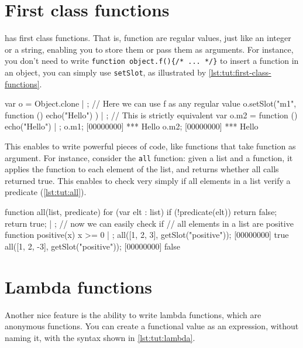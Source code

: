 \section{First class functions}

\us has first class functions. That is, function are regular values,
just like an integer or a string, enabling you to store them or pass
them as arguments. For instance, you don't need to write
\lstinline|function object.f(){/* ... */}| to insert a function in an
object, you can simply use \lstinline{setSlot}, as illustrated by
\autoref{lst:tut:first-class-functions}.

\begin{urbiscript}[caption=First class functions,
  label=lst:tut:first-class-functions]
var o = Object.clone | {};
// Here we can use f as any regular value
o.setSlot("m1", function () { echo("Hello") }) | {};
// This is strictly equivalent
var o.m2 = function () { echo("Hello") } | {};
o.m1;
[00000000] *** Hello
o.m2;
[00000000] *** Hello
\end{urbiscript}

This enables to write powerful pieces of code, like functions that
take function as argument. For instance, consider the \lstinline{all}
function: given a list and a function, it applies the function to each
element of the list, and returns whether all calls returned true. This
enables to check very simply if all elements in a list verify a
predicate (\autoref{lst:tut:all}).

\begin{urbiscript}[caption=Functional programming: the \lstinline{all}
  function, label=lst:tut:all, name=all]
function all(list, predicate)
{
  for (var elt : list)
    if (!predicate(elt))
      return false;
  return true;
} | {};
// now we can easily check if
// all elements in a list are positive
function positive(x) { x >= 0 } | {};
all([1, 2, 3], getSlot("positive"));
[00000000] true
all([1, 2, -3], getSlot("positive"));
[00000000] false
\end{urbiscript}

\section{Lambda functions}

Another nice feature is the ability to write lambda functions, which
are anonymous functions. You can create a functional value as an
expression, without naming it, with the syntax shown in \autoref{lst:tut:lambda}.

